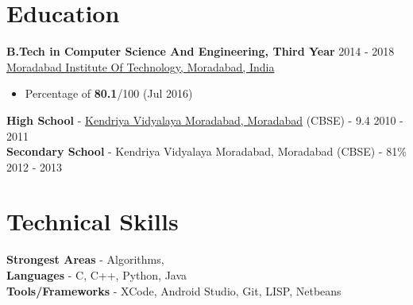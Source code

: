 \documentclass[margin, centered]{res}
\begin{document}
\begin{resume}

\section{Education}
\textbf{B.Tech in Computer Science And Engineering, Third Year} \hfill 2014 - 2018 \\
\href{http://nitk.ac.in/}{Moradabad Institute Of Technology, Moradabad, India}
\begin{itemize}
 \item Percentage of \textbf{80.1}/100 (Jul 2016)
\end{itemize}
\textbf{High School} - \href{http://kvmoradabad.ac.in/}{Kendriya Vidyalaya Moradabad, Moradabad} (CBSE) - 9.4 \hfill 2010 - 2011 \\
\textbf{Secondary School} - Kendriya Vidyalaya Moradabad, Moradabad (CBSE) - 81\% \hfill 2012 - 2013
 



\section{Technical \hspace{2mm} Skills}
\textbf{Strongest Areas} -  Algorithms,  \\
\textbf{Languages} - C, C++, Python, Java\\
\textbf{Tools/Frameworks} - XCode, Android Studio, Git, LISP, Netbeans





\end{resume}
\end{document}
